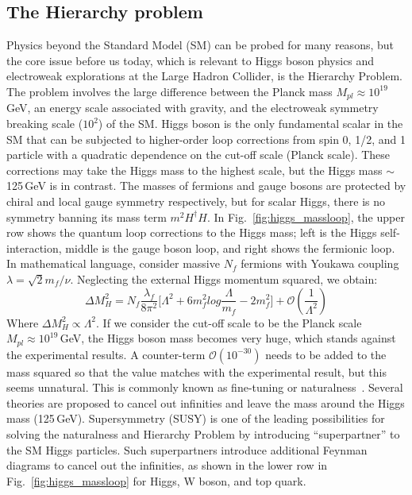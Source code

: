 \subsection{The Hierarchy problem}\label{subsec:hierarchy}
Physics beyond the Standard Model (SM) can be probed for many reasons, but the core issue before us today, which is relevant to Higgs boson physics and electroweak explorations at the Large Hadron Collider, is the Hierarchy Problem. The problem involves the large difference between the Planck mass $M_{pl} \approx 10^{19}$\,GeV, an energy scale associated with gravity, and the electroweak symmetry breaking scale ($10^{2}$) of the SM. Higgs boson is the only fundamental scalar in the SM that can be subjected to higher-order loop corrections from spin 0, 1/2, and 1 particle with a quadratic dependence on the cut-off scale (Planck scale). These corrections may take the Higgs mass to the highest scale, but the Higgs mass $\sim$ 125\,GeV is in contrast. The masses of fermions and gauge bosons are protected by chiral and local gauge symmetry respectively, but for scalar Higgs, there is no symmetry banning its mass term $m^{2}H^{\dagger}H$. In Fig.~\ref{fig:higgs_massloop}, the upper row shows the quantum loop corrections to the Higgs mass; left is the Higgs self-interaction, middle is the gauge boson loop, and right shows the fermionic loop. In mathematical language, consider massive $N_{f}$ fermions with Youkawa coupling $\lambda = \sqrt{2}m_{f}/\nu$. Neglecting the external Higgs momentum squared, we obtain:
\begin{equation}\label{equ:hierarchy}
\Delta M_{H}^{2} = N_{f}\frac{\lambda_{f}}{8\pi^{2}}\Big[\Lambda^{2} + 6m_{f}^{2}log\frac{\Lambda}{m_{f}} - 2m_{f}^{2} \Big] + \mathcal{O}(\frac{1}{\Lambda^{2}})
\end{equation}
Where $\Delta M_{H}^{2}\propto \Lambda^{2}$. If we consider the cut-off scale to be the Planck scale $M_{pl} \approx 10^{19}$\,GeV, the Higgs boson mass becomes very huge, which stands against the experimental results. A counter-term $\mathcal{O}(10^{-30})$ needs to be added to the mass squared so that the value matches with the experimental result, but this seems unnatural. This is commonly known as fine-tuning or naturalness~\cite{hierarchy}. Several theories are proposed to cancel out infinities and leave the mass around the Higgs mass (125\,GeV). Supersymmetry (SUSY) is one of the leading possibilities for solving the naturalness and Hierarchy Problem by introducing ``superpartner'' to the SM Higgs particles. Such superpartners introduce additional Feynman diagrams to cancel out the infinities, as shown in the lower row in Fig.~\ref{fig:higgs_massloop} for Higgs, W boson, and top quark.     
